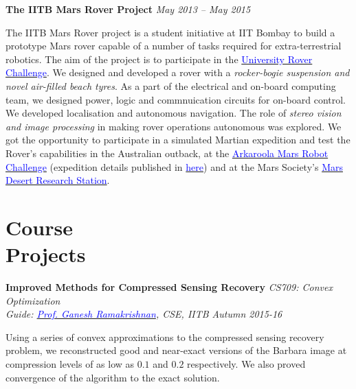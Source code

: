\documentclass[margin,line]{res}
\newenvironment{list1}{
  \begin{list}{\ding{113}}{%
      \setlength{\itemsep}{0in}
      \setlength{\parsep}{0in} \setlength{\parskip}{0in}
      \setlength{\topsep}{0in} \setlength{\partopsep}{0in} 
      \setlength{\leftmargin}{0.17in}}}{\end{list}}
\begin{document}
\begin{resume}
{\bf The IITB Mars Rover Project}
\hfill {\it May 2013 -- May 2015} \\
\vspace*{-.13in}
\begin{list1}
\item[]
The IITB Mars Rover project is a student initiative at IIT Bombay to build a prototype Mars rover capable of a number of tasks required for extra-terrestrial robotics. The aim of the project is to participate in the \href{urc.marssociety.org/}{\textcolor{blue} {University Rover Challenge}}. We designed and developed a rover with a \textit{rocker-bogie suspension and novel air-filled beach tyres}. As a part of the electrical and on-board computing team, we designed power, logic and commnuication circuits for on-board control. We developed localisation and autonomous navigation. The role of \textit{stereo vision and image processing} in making rover operations autonomous was explored. We got the opportunity to participate in a simulated Martian expedition and test the Rover's capabilities in the Australian outback, at the \href{http://marssociety.org.au/article/arkaroola-mars-robot-challenge-spaceward-bound-expedition}{\textcolor{blue} {Arkaroola Mars Robot Challenge}} (expedition details published in \href{http://www.nssa.com.au/14asrc/14ASRC-proceedings.zip}{\textcolor{blue} {here}}) and at the Mars Society's \href{http://mdrs.marssociety.org/}{\textcolor{blue} {Mars Desert Research Station}}.
\end{list1}

\section{\sc Course \\Projects}
{\bf Improved Methods for Compressed Sensing Recovery} \hfill {\it CS709: Convex Optimization} \\
{\em Guide: \href{https://www.cse.iitb.ac.in/~ganesh/}{\textcolor{blue}{Prof. Ganesh Ramakrishnan}}, CSE, IITB \hfill Autumn 2015-16} \\
\vspace*{-.15in}
\begin{list1}
\item[] Using a series of convex approximations to the compressed sensing recovery problem, we reconstructed good and near-exact versions of the Barbara image at compression levels of as low as $0.1$ and $0.2$ respectively. We also proved convergence of the algorithm to the exact solution.
\end{list1}


\end{resume}
\end{document}
